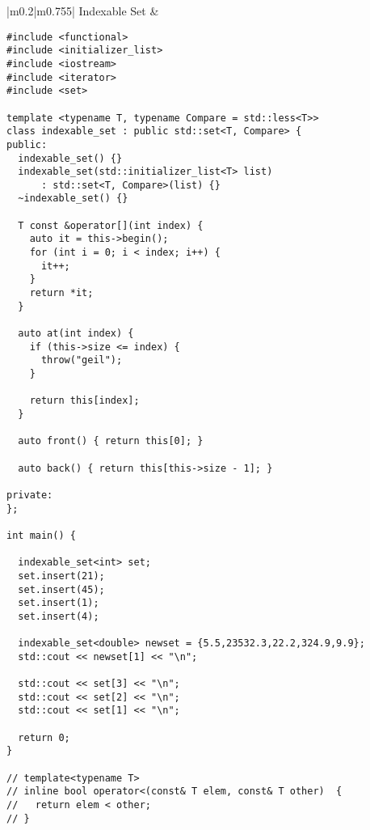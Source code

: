 \documentclass[main.tex,fontsize=8pt,paper=a4,paper=portrait,DIV=calc]{scrartcl}
\begin{document}
\begin{table}[ht!]
\begin{tabular}{|m{0.2\linewidth}|m{0.755\linewidth}|}
\hline
Indexable Set & 
\vspace{2mm}
\begin{lstlisting}
#include <functional>
#include <initializer_list>
#include <iostream>
#include <iterator>
#include <set>

template <typename T, typename Compare = std::less<T>>
class indexable_set : public std::set<T, Compare> {
public:
  indexable_set() {}
  indexable_set(std::initializer_list<T> list)
      : std::set<T, Compare>(list) {}
  ~indexable_set() {}

  T const &operator[](int index) {
    auto it = this->begin();
    for (int i = 0; i < index; i++) {
      it++;
    }
    return *it;
  }

  auto at(int index) {
    if (this->size <= index) {
      throw("geil");
    }

    return this[index];
  }

  auto front() { return this[0]; }

  auto back() { return this[this->size - 1]; }

private:
};

int main() {

  indexable_set<int> set;
  set.insert(21);
  set.insert(45);
  set.insert(1);
  set.insert(4);

  indexable_set<double> newset = {5.5,23532.3,22.2,324.9,9.9};
  std::cout << newset[1] << "\n";

  std::cout << set[3] << "\n";
  std::cout << set[2] << "\n";
  std::cout << set[1] << "\n";

  return 0;
}

// template<typename T>
// inline bool operator<(const& T elem, const& T other)  {
//   return elem < other;
// }
\end{lstlisting}
\\
\hline
\end{tabular}
\end{table}
\pagebreak
\end{document}
